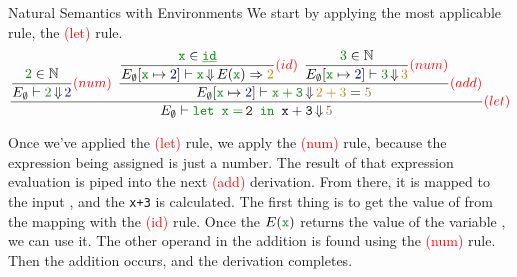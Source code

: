 \begin{example}[Lecture 3]{Natural Semantics with Environments}
  We start by applying the most applicable rule, the \textcolor{red}{(let)} rule.
  \begin{equation*}
    \dfrac{
      \dfrac{\SemanticInput{2} \in \NaturalNumbers}{E_{\emptyset} \vdash \SemanticInput{2} \EvaluatesTo \textcolor{Blue4}{2}} \textcolor{red}{(num)} \:\:
      \dfrac{
        \dfrac{\SemanticInput{\mathtt{x}} \in \SemanticInput{\mathtt{\underline{id}}}}
        {E_{\emptyset} [\SemanticInput{\mathtt{x}} \mapsto \textcolor{Blue4}{2}] \vdash \SemanticInput{\mathtt{x}} \EvaluatesTo E(\SemanticInput{\mathtt{x}}) \Rightarrow \textcolor{Orange3}{2}} \textcolor{red}{(id)} \:\:
        \dfrac{\SemanticInput{3} \in \NaturalNumbers}
        {E_{\emptyset} [\SemanticInput{\mathtt{x}} \mapsto \textcolor{Blue4}{2}] \vdash \SemanticInput{3} \EvaluatesTo \textcolor{Orange3}{3}} \textcolor{red}{(num)}}
      {E_{\emptyset}[\SemanticInput{\mathtt{x}} \mapsto \textcolor{Blue4}{2}] \vdash \SemanticInput{\mathtt{x+3}} \EvaluatesTo \textcolor{Orange3}{2+3} = \textcolor{Burlywood4}{5}} \textcolor{red}{(add)}}
    {E_{\emptyset} \vdash \SemanticInput{\text{\texttt{let }}} \mathtt{\SemanticInput{x=}\,2} \SemanticInput{\text{\texttt{ in }}} \mathtt{x+3} \EvaluatesTo \textcolor{Burlywood4}{5}} \textcolor{red}{(let)}
  \end{equation*}

  Once we've applied the \textcolor{red}{(let)} rule, we apply the \textcolor{red}{(num)} rule, because the expression being assigned is just a number.
  The result of that expression evaluation is piped into the next \textcolor{red}{(add)} derivation.
  From there, it is mapped to the input , and the \texttt{x+3} is calculated.
  The first thing is to get the value of  from the mapping with the \textcolor{red}{(id)} rule.
  Once the $E(\SemanticInput{\mathtt{x}})$ returns the value of the variable , we can use it.
  The other operand in the addition is found using the \textcolor{red}{(num)} rule.
  Then the addition occurs, and the derivation completes.
\end{example}

